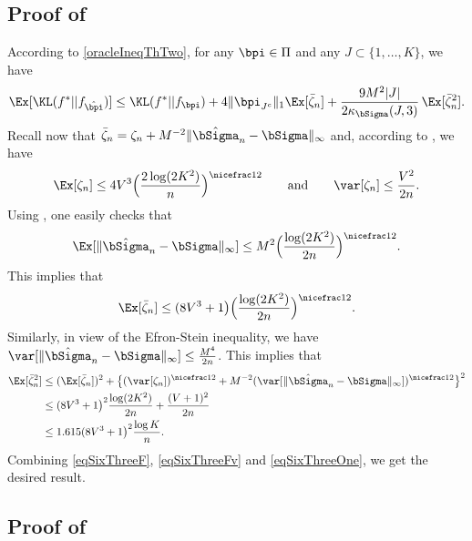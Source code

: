 \subsection{Proof of }

According to \eqref{oracleIneqThTwo}, for any $\bpi\in \Pi$ and
any $J\subset\{1,\dots,K\}$, we have
\begin{equation}\label{eqSixThreeOne}
  \Ex[\KL(f^*|| f_{\hat\bpi})] \leq \KL(f^*|| f_{\bpi}) + 4\| \bpi_{J^c}\|_1\Ex[\bar\zeta_n] +
  \frac{9 M^2|J|}{2\kappa_{\bSigma}(J,3)}\,\Ex[\bar\zeta_n^2].
\end{equation}
Recall now that $\bar\zeta_n = \zeta_n+M^{-2}\|\hat\bSigma_n-\bSigma\|_{\infty}$ and, according to
, we have
\begin{equation}\label{eqSixThreeTw}
  \Ex[\zeta_n] \leq 4V^3\Big(\frac{2\log(2K^2)}{n}\Big)^{\nicefrac12} \qquad\text{and}\qquad
  \var[\zeta_n] \leq \frac{V^2}{2n}.
\end{equation}
Using , one easily checks that
\begin{equation}\label{eqSixThreeTh}
  \Ex[\|\hat\bSigma_n-\bSigma\|_{\infty}] \leq M^2\Big(\frac{\log(2K^2)}{2n}\Big)^{\nicefrac12}.
\end{equation}
This implies that
\begin{equation}\label{eqSixThreeF}
  \Ex[\bar\zeta_n] \leq (8V^3+1\big)\Big(\frac{\log(2K^2)}{2n}\Big)^{\nicefrac12}.
\end{equation}
Similarly, in view of the Efron-Stein inequality, we have
$\var[\|\hat\bSigma_n-\bSigma\|_{\infty}]\le \frac{M^4}{2n}$. This implies that
\begin{align}
  \Ex[\bar\zeta_n^2]
    &\leq (\Ex[\bar\zeta_n])^2 + \big\{(\var[\zeta_n])^{\nicefrac12}+
			M^{-2}(\var[\|\hat\bSigma_n-\bSigma\|_{\infty}])^{\nicefrac12}\big\}^2 \\
    &\le (8V^3+1\big)^2\frac{\log(2K^2)}{2n} + \frac{(V+1)^2}{2n}\\
    &\le 1.615(8V^3+1\big)^2\frac{\log K}{n}.\label{eqSixThreeFv}
\end{align}
Combining \eqref{eqSixThreeF}, \eqref{eqSixThreeFv} and \eqref{eqSixThreeOne}, we get the desired result.

\subsection{Proof of }


